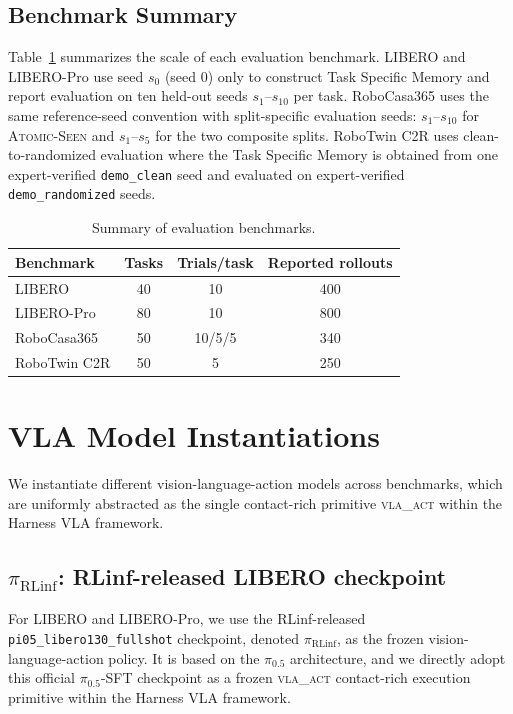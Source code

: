 \documentclass[11pt]{article}
\newcommand{\piRLinf}{\pi_{\mathrm{RLinf}}}
\begin{document}
\subsection{Benchmark Summary}
\label{app:benchmark_summary}

Table~\ref{tab:app_benchmark_summary} summarizes the scale of each evaluation benchmark. LIBERO and LIBERO-Pro use seed $s_0$ (seed 0) only to construct Task Specific Memory and report evaluation on ten held-out seeds $s_1$--$s_{10}$ per task. RoboCasa365 uses the same reference-seed convention with split-specific evaluation seeds: $s_1$--$s_{10}$ for \textsc{Atomic-Seen} and $s_1$--$s_5$ for the two composite splits. RoboTwin C2R uses clean-to-randomized evaluation where the Task Specific Memory is obtained from one expert-verified \texttt{demo\_clean} seed and evaluated on expert-verified \texttt{demo\_randomized} seeds.

\begin{table}[h]
    \centering
    \caption{Summary of evaluation benchmarks.}
    \label{tab:app_benchmark_summary}
    \begin{tabular}{lccc}
        \toprule
        Benchmark & Tasks & Trials/task & Reported rollouts \\
        \midrule
        LIBERO & 40 & 10 & 400 \\
        LIBERO-Pro & 80 & 10 & 800 \\
        RoboCasa365 & 50 & 10/5/5 & 340 \\
        RoboTwin C2R & 50 & 5 & 250 \\
        \bottomrule
    \end{tabular}
\end{table}

\section{VLA Model Instantiations}
\label{app:vla_instantiations}

We instantiate different vision-language-action models across benchmarks, which are uniformly abstracted as the single contact-rich primitive \textsc{vla\_act} within the Harness VLA framework.
\subsection{\texorpdfstring{$\piRLinf$}{pi\_RLinf}: RLinf-released LIBERO checkpoint}

For LIBERO and LIBERO-Pro, we use the RLinf-released \texttt{pi05\_libero130\_fullshot} checkpoint, denoted $\piRLinf$, as the frozen vision-language-action policy. It is based on the $\pi_{0.5}$ architecture, and we directly adopt this official $\pi_{0.5}$-SFT checkpoint as a frozen \textsc{vla\_act} contact-rich execution primitive within the Harness VLA framework.
\end{document}
